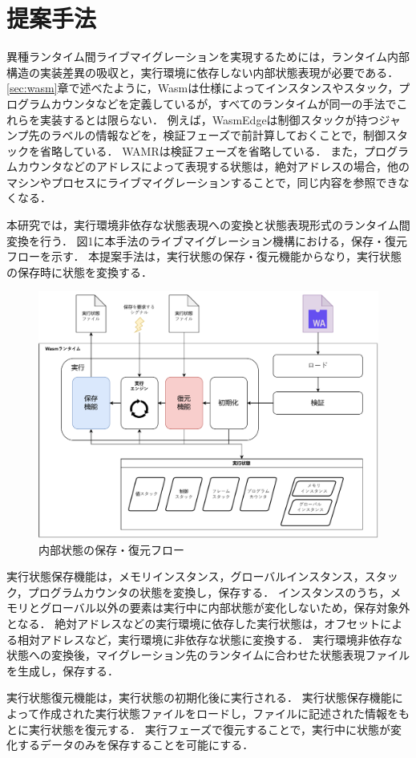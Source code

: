 \chapter{提案手法}
異種ランタイム間ライブマイグレーションを実現するためには，ランタイム内部構造の実装差異の吸収と，実行環境に依存しない内部状態表現が必要である．
\ref{sec:wasm}章で述べたように，Wasmは仕様によってインスタンスやスタック，プログラムカウンタなどを定義しているが，すべてのランタイムが同一の手法でこれらを実装するとは限らない．
例えば，WasmEdgeは制御スタックが持つジャンプ先のラベルの情報などを，検証フェーズで前計算しておくことで，制御スタックを省略している．
WAMRは検証フェーズを省略している．
また，プログラムカウンタなどのアドレスによって表現する状態は，絶対アドレスの場合，他のマシンやプロセスにライブマイグレーションすることで，同じ内容を参照できなくなる．

本研究では，実行環境非依存な状態表現への変換と状態表現形式のランタイム間変換を行う．
図1に本手法のライブマイグレーション機構における，保存・復元フローを示す．
本提案手法は，実行状態の保存・復元機能からなり，実行状態の保存時に状態を変換する．

\begin{figure}[t]
    \centering
    \includegraphics*[width=1\linewidth]{images/dump-restore}
    \caption{内部状態の保存・復元フロー}
    \label{fig:dump-restore}
\end{figure}

実行状態保存機能は，メモリインスタンス，グローバルインスタンス，スタック，プログラムカウンタの状態を変換し，保存する．
インスタンスのうち，メモリとグローバル以外の要素は実行中に内部状態が変化しないため，保存対象外となる．
絶対アドレスなどの実行環境に依存した実行状態は，オフセットによる相対アドレスなど，実行環境に非依存な状態に変換する．
実行環境非依存な状態への変換後，マイグレーション先のランタイムに合わせた状態表現ファイルを生成し，保存する．

実行状態復元機能は，実行状態の初期化後に実行される．
実行状態保存機能によって作成された実行状態ファイルをロードし，ファイルに記述された情報をもとに実行状態を復元する．
実行フェーズで復元することで，実行中に状態が変化するデータのみを保存することを可能にする．